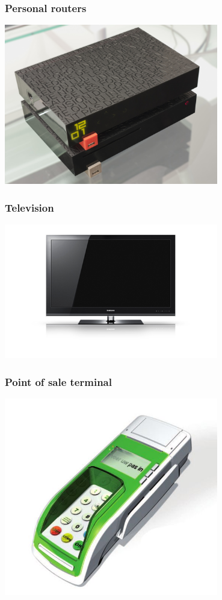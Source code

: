 \begin{frame}
  \frametitle{Personal routers}
  \begin{center}
    \includegraphics[width=0.7\textwidth]{slides/sysdev-intro/freebox.jpg}
  \end{center}
\end{frame}

\begin{frame}
\frametitle{Television}
  \begin{center}
    \includegraphics[width=0.7\textwidth]{slides/sysdev-intro/television.jpg}
  \end{center}
\end{frame}

\begin{frame}
\frametitle{Point of sale terminal}
  \begin{center}
    \includegraphics[width=0.7\textwidth]{slides/sysdev-intro/point-of-sale.jpg}
  \end{center}
\end{frame}

